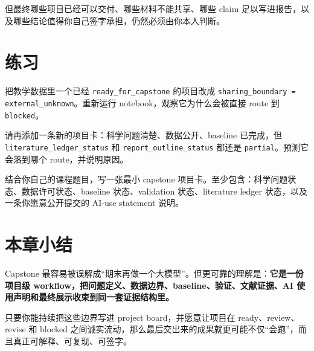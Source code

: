 但最终哪些项目已经可以交付、哪些材料不能共享、哪些 claim 足以写进报告，以及哪些结论值得你自己签字承担，仍然必须由你本人判断。

\section{练习}

\begin{exercisebox}[基础练习]
把教学数据里一个已经 \texttt{ready\_for\_capstone} 的项目改成 \texttt{sharing\_boundary = external\_unknown}。重新运行 notebook，观察它为什么会被直接 route 到 \texttt{blocked}。
\end{exercisebox}

\begin{exercisebox}[进阶练习]
请再添加一条新的项目卡：科学问题清楚、数据公开、baseline 已完成，但 \texttt{literature\_ledger\_status} 和 \texttt{report\_outline\_status} 都还是 \texttt{partial}。预测它会落到哪个 route，并说明原因。
\end{exercisebox}

\begin{exercisebox}[开放练习]
结合你自己的课程题目，写一张最小 capstone 项目卡。至少包含：科学问题状态、数据许可状态、baseline 状态、validation 状态、literature ledger 状态，以及一条你愿意公开提交的 AI-use statement 说明。
\end{exercisebox}

\section{本章小结}

Capstone 最容易被误解成“期末再做一个大模型”。但更可靠的理解是：\textbf{它是一份项目级 workflow，把问题定义、数据边界、baseline、验证、文献证据、AI 使用声明和最终展示收束到同一套证据结构里。}

只要你能持续把这些边界写进 project board，并愿意让项目在 ready、review、revise 和 blocked 之间诚实流动，那么最后交出来的成果就更可能不仅“会跑”，而且真正可解释、可复现、可签字。
